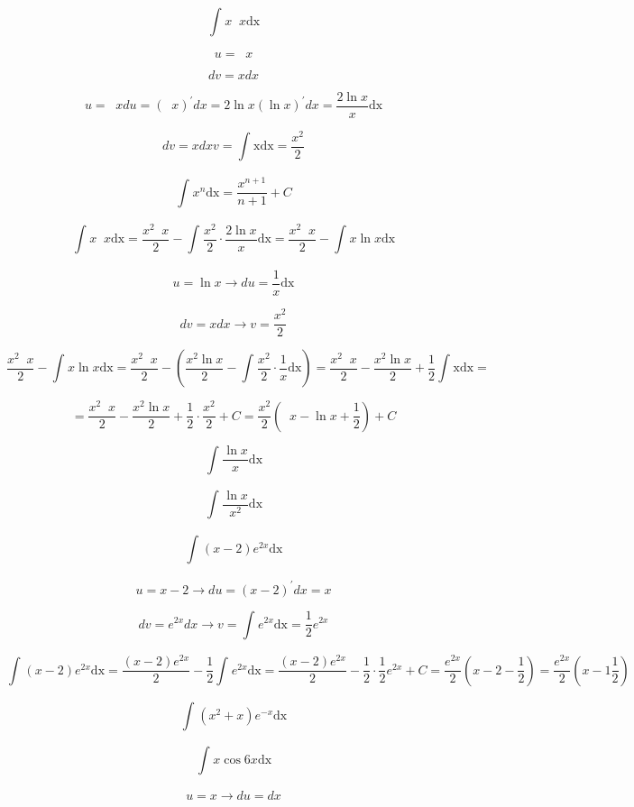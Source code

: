 \documentclass[]{article}
\date{}
\begin{document}
\[\int_{}^{}{x\operatorname{}x\text{dx}}\]

\[u = \operatorname{}x\]

\[dv = xdx\]

\[u = \operatorname{}xdu = \left( \operatorname{}x \right)^{'}dx = 2\ln x\left( \ln x \right)^{'}dx = \frac{2\ln x}{x}\text{dx}\]

\[dv = xdxv = \int_{}^{}\text{xdx} = \frac{x^{2}}{2}\]

\[\int_{}^{}{x^{n}\text{dx}} = \frac{x^{n + 1}}{n + 1} + C\]

\[\int_{}^{}{x\operatorname{}x\text{dx}} = \frac{x^{2}\operatorname{}x}{2} - \int_{}^{}{\frac{x^{2}}{2} \cdot \frac{2\ln x}{x}\text{dx}} = \frac{x^{2}\operatorname{}x}{2} - \int_{}^{}{x\ln x\text{dx}}\]

\[u = \ln x \rightarrow du = \frac{1}{x}\text{dx}\]

\[dv = xdx \rightarrow v = \frac{x^{2}}{2}\]

\[\frac{x^{2}\operatorname{}x}{2} - \int_{}^{}{x\ln x\text{dx}} = \frac{x^{2}\operatorname{}x}{2} - \left( \frac{x^{2}\ln x}{2} - \int_{}^{}{\frac{x^{2}}{2} \cdot \frac{1}{x}\text{dx}} \right) = \frac{x^{2}\operatorname{}x}{2} - \frac{x^{2}\ln x}{2} + \frac{1}{2}\int_{}^{}\text{xdx} =\]

\[= \frac{x^{2}\operatorname{}x}{2} - \frac{x^{2}\ln x}{2} + \frac{1}{2} \cdot \frac{x^{2}}{2} + C = \frac{x^{2}}{2}\left( \operatorname{}x - \ln x + \frac{1}{2} \right) + C\]

\[\int_{}^{}{\frac{\ln x}{x}\text{dx}}\]

\[\int_{}^{}{\frac{\ln x}{x^{2}}\text{dx}}\]

\[\int_{}^{}{\left( x - 2 \right)e^{2x}\text{dx}}\]

\[u = x - 2 \rightarrow du = \left( x - 2 \right)^{'}dx = x\]

\[dv = e^{2x}dx \rightarrow v = \int_{}^{}{e^{2x}\text{dx}} = \frac{1}{2}e^{2x}\]

\[\int_{}^{}{\left( x - 2 \right)e^{2x}\text{dx}} = \frac{\left( x - 2 \right)e^{2x}}{2} - \frac{1}{2}\int_{}^{}{e^{2x}\text{dx}} = \frac{\left( x - 2 \right)e^{2x}}{2} - \frac{1}{2} \cdot \frac{1}{2}e^{2x} + C = \frac{e^{2x}}{2}\left( x - 2 - \frac{1}{2} \right) = \frac{e^{2x}}{2}\left( x - 1\frac{1}{2} \right)\]

\[\int_{}^{}{\left( x^{2} + x \right)e^{- x}\text{dx}}\]

\[\int_{}^{}{x\cos{6x}\text{dx}}\]

\[u = x \rightarrow du = dx\]
\end{document}

